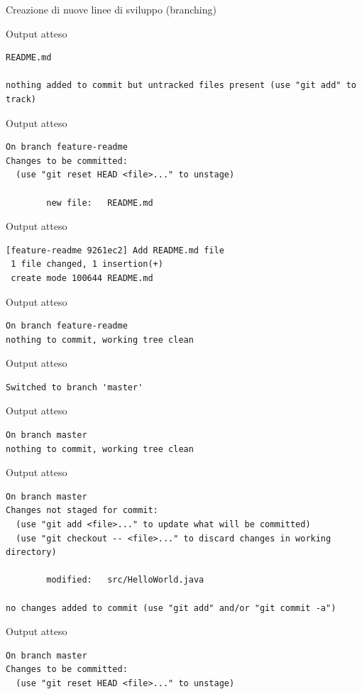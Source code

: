 \documentclass[xcolor=dvipsnames,presentation]{beamer}
\begin{document}
\begin{frame}{Creazione di nuove linee di sviluppo (branching)}
\begin{block}{Output atteso}
\begin{Verbatim}[fontsize=\scriptsize]
        README.md

nothing added to commit but untracked files present (use "git add" to track)
		\end{Verbatim}
	\end{block}
	\begin{block}{Output atteso}
		\begin{Verbatim}[fontsize=\scriptsize]
On branch feature-readme
Changes to be committed:
  (use "git reset HEAD <file>..." to unstage)

        new file:   README.md

		\end{Verbatim}
	\end{block}
	\begin{block}{Output atteso}
		\begin{Verbatim}[fontsize=\scriptsize]
[feature-readme 9261ec2] Add README.md file
 1 file changed, 1 insertion(+)
 create mode 100644 README.md
		\end{Verbatim}
	\end{block}
	\begin{block}{Output atteso}
		\begin{Verbatim}[fontsize=\scriptsize]
On branch feature-readme
nothing to commit, working tree clean
		\end{Verbatim}
	\end{block}
	\begin{block}{Output atteso}
		\begin{Verbatim}[fontsize=\scriptsize]
Switched to branch 'master'
		\end{Verbatim}
	\end{block}
	\begin{block}{Output atteso}
		\begin{Verbatim}[fontsize=\scriptsize]
On branch master
nothing to commit, working tree clean
		\end{Verbatim}
	\end{block}
	\begin{block}{Output atteso}
		\begin{Verbatim}[fontsize=\scriptsize]
On branch master
Changes not staged for commit:
  (use "git add <file>..." to update what will be committed)
  (use "git checkout -- <file>..." to discard changes in working directory)

        modified:   src/HelloWorld.java

no changes added to commit (use "git add" and/or "git commit -a")
		\end{Verbatim}
	\end{block}
	\begin{block}{Output atteso}
		\begin{Verbatim}[fontsize=\scriptsize]
On branch master
Changes to be committed:
  (use "git reset HEAD <file>..." to unstage)


\end{Verbatim}
\end{block}
\end{frame}
\end{document}
